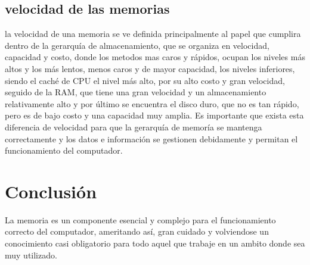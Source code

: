 \documentclass{article}
\begin{document}
\subsection{velocidad de las memorias}
la velocidad de una memoria se ve definida principalmente al papel que cumplira dentro de la gerarquía de almacenamiento, que se organiza en velocidad, capacidad y costo, donde los metodos mas caros y rápidos, ocupan los niveles más altos y los más lentos, menos caros y de mayor capacidad, los niveles inferiores, siendo el caché de 
CPU el nivel más alto, por su alto costo y gran velocidad, seguido de la RAM, que tiene una gran velocidad y un almacenamiento relativamente alto y por último se encuentra el disco duro, que no es tan rápido, pero es de bajo costo y una capacidad muy amplia. Es importante que exista esta diferencia de velocidad para que la gerarquía de memoría se mantenga correctamente y los datos e información se gestionen debidamente y permitan el funcionamiento del computador.\cite{geniolandia}



\section{Conclusión} \label{conclulsion}
La memoria es un componente esencial y complejo para el funcionamiento correcto del computador, ameritando así, gran cuidado y volviendose un conocimiento casi obligatorio para todo aquel que trabaje en un ambito donde sea muy utilizado.



\end{document}
